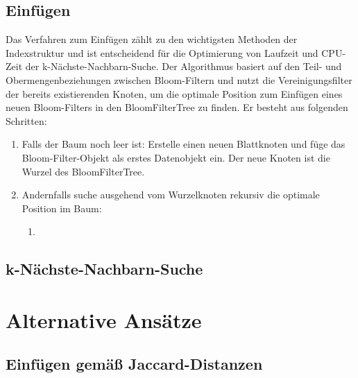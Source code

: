 \subsection{Einfügen}\label{sec:einfügen}
Das Verfahren zum Einfügen zählt zu den wichtigsten Methoden der Indexstruktur und ist entscheidend für die Optimierung von Laufzeit und CPU-Zeit der k-Nächste-Nachbarn-Suche. Der Algorithmus basiert auf den Teil- und Obermengenbeziehungen zwischen Bloom-Filtern und nutzt die Vereinigungsfilter der bereits existierenden Knoten, um die optimale Position zum Einfügen eines neuen Bloom-Filters in den BloomFilterTree zu finden. Er besteht aus folgenden Schritten: 
\begin{enumerate}
	\item Falls der Baum noch leer ist: Erstelle einen neuen Blattknoten und füge das Bloom-Filter-Objekt als erstes Datenobjekt ein. Der neue Knoten ist die Wurzel des BloomFilterTree.  
	\item Andernfalls suche ausgehend vom Wurzelknoten rekursiv die optimale Position im Baum: 
	\begin{enumerate}
		\item %
	\end{enumerate}
\end{enumerate}
\subsection{k-Nächste-Nachbarn-Suche}\label{sec:knn}
\section{Alternative Ansätze}\label{sec:alternativen}
\subsection{Einfügen gemäß Jaccard-Distanzen}\label{sec:ähnlichkeit}
